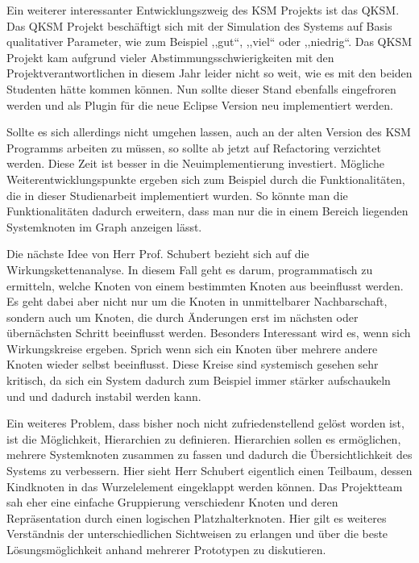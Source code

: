Ein weiterer interessanter Entwicklungszweig des KSM Projekts ist das QKSM. Das QKSM Projekt beschäftigt sich mit der Simulation des Systems auf Basis qualitativer Parameter, wie zum Beispiel ,,gut``, ,,viel`` oder ,,niedrig``. Das QKSM Projekt kam aufgrund vieler Abstimmungsschwierigkeiten mit den Projektverantwortlichen in diesem Jahr leider nicht so weit, wie es mit den beiden Studenten hätte kommen können. Nun sollte dieser Stand ebenfalls eingefroren werden und als Plugin für die neue Eclipse Version neu implementiert werden.

Sollte es sich allerdings nicht umgehen lassen, auch an der alten Version des KSM Programms arbeiten zu müssen, so sollte ab jetzt auf Refactoring verzichtet werden. Diese Zeit ist besser in die Neuimplementierung investiert. Mögliche Weiterentwicklungspunkte ergeben sich zum Beispiel durch die Funktionalitäten, die in dieser Studienarbeit implementiert wurden. So könnte man die Funktionalitäten dadurch erweitern, dass man nur die in einem Bereich liegenden Systemknoten im Graph anzeigen lässt. 

Die nächste Idee von Herr Prof. Schubert bezieht sich auf die Wirkungskettenanalyse. In diesem Fall geht es darum, programmatisch zu ermitteln, welche Knoten von einem bestimmten Knoten aus beeinflusst werden. Es geht dabei aber nicht nur um die Knoten in unmittelbarer Nachbarschaft, sondern auch um Knoten, die durch Änderungen erst im nächsten oder übernächsten Schritt beeinflusst werden. Besonders Interessant wird es, wenn sich Wirkungskreise ergeben. Sprich wenn sich ein Knoten über mehrere andere Knoten wieder selbst beeinflusst. Diese Kreise sind systemisch gesehen sehr kritisch, da sich ein System dadurch zum Beispiel immer stärker aufschaukeln und und dadurch instabil werden kann.

Ein weiteres Problem, dass bisher noch nicht zufriedenstellend gelöst worden ist, ist die Möglichkeit, Hierarchien zu definieren. Hierarchien sollen es ermöglichen, mehrere Systemknoten zusammen zu fassen und dadurch die Übersichtlichkeit des Systems zu verbessern. Hier sieht Herr Schubert eigentlich einen Teilbaum, dessen Kindknoten in das Wurzelelement eingeklappt werden können. Das Projektteam sah eher eine einfache Gruppierung verschiedenr Knoten und deren Repräsentation durch einen logischen Platzhalterknoten. Hier gilt es weiteres Verständnis der unterschiedlichen Sichtweisen zu erlangen und über die beste Lösungsmöglichkeit anhand mehrerer Prototypen zu diskutieren.